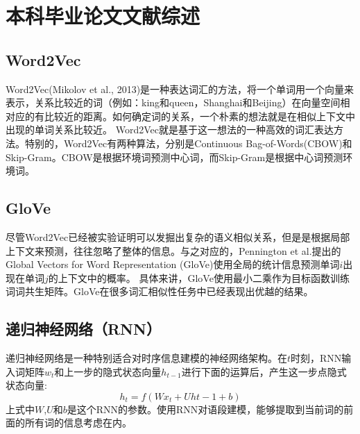\chapter{本科毕业论文文献综述}

\section{Word2Vec}
Word2Vec(Mikolov et al., 2013\cite{mikolov2013efficient})是一种表达词汇的方法，将一个单词用一个向量来表示，关系比较近的词（例如：king和queen，Shanghai和Beijing）在向量空间相对应的有比较近的距离。如何确定词的关系，一个朴素的想法就是在相似上下文中出现的单词关系比较近。
Word2Vec就是基于这一想法的一种高效的词汇表达方法。特别的，Word2Vec有两种算法，分别是Continuous Bag-of-Words(CBOW)和Skip-Gram。CBOW是根据环境词预测中心词，而Skip-Gram是根据中心词预测环境词。\\
\section{GloVe}
尽管Word2Vec已经被实验证明可以发掘出复杂的语义相似关系，但是是根据局部上下文来预测，往往忽略了整体的信息。与之对应的，Pennington et al.\cite{pennington2014glove}提出的Global Vectors for Word Representation (GloVe)使用全局的统计信息预测单词$i$出现在单词$j$的上下文中的概率。
具体来讲，GloVe使用最小二乘作为目标函数训练词词共生矩阵。GloVe在很多词汇相似性任务中已经表现出优越的结果。\\
\section{递归神经网络（RNN）}
递归神经网络是一种特别适合对时序信息建模的神经网络架构。在$t$时刻，RNN输入词矩阵$w_t$和上一步的隐式状态向量$h_{t-1}$进行下面的运算后，产生这一步点隐式状态向量:\\
\begin{equation}
h_t = f(Wx_t+Uh{t-1}+b)
\end{equation}
上式中$W$,$U$和$b$是这个RNN的参数。使用RNN对语段建模，能够提取到当前词的前面的所有词的信息考虑在内。
